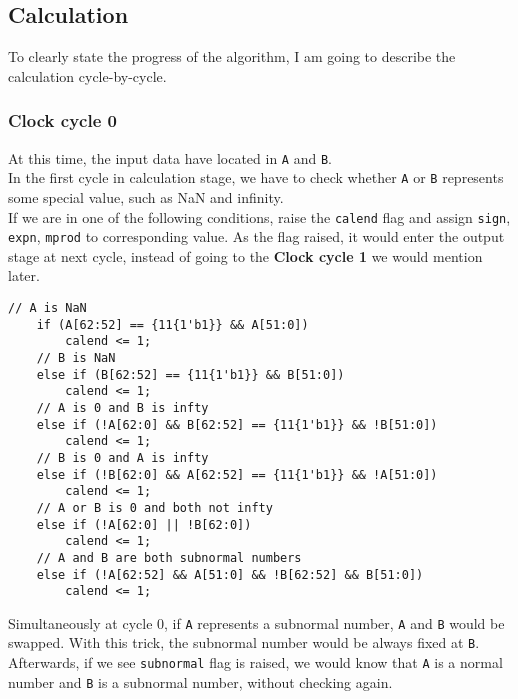 \documentclass{article}
\begin{document}
        \subsection{Calculation}
            To clearly state the progress of the algorithm, I am going to describe the calculation cycle-by-cycle.
            \subsubsection*{Clock cycle 0}
                At this time, the input data have located in {\tt A} and {\tt B}. \\
                In the first cycle in calculation stage, we have to check whether {\tt A} or {\tt B} represents some special value, such as NaN and infinity. \\
                If we are in one of the following conditions, raise the {\tt calend} flag and assign {\tt sign}, {\tt expn}, {\tt mprod} to corresponding value. As the flag raised, it would enter the output stage at next cycle, instead of going to the {\bf Clock cycle 1} we would mention later.
                \begin{lstlisting}[style=verilog-style]
    // A is NaN
    if (A[62:52] == {11{1'b1}} && A[51:0])
        calend <= 1;
    // B is NaN
    else if (B[62:52] == {11{1'b1}} && B[51:0])
        calend <= 1;
    // A is 0 and B is infty
    else if (!A[62:0] && B[62:52] == {11{1'b1}} && !B[51:0])
        calend <= 1;
    // B is 0 and A is infty
    else if (!B[62:0] && A[62:52] == {11{1'b1}} && !A[51:0])
        calend <= 1;
    // A or B is 0 and both not infty
    else if (!A[62:0] || !B[62:0])
        calend <= 1;
    // A and B are both subnormal numbers
    else if (!A[62:52] && A[51:0] && !B[62:52] && B[51:0])
        calend <= 1;
                \end{lstlisting}
                
                Simultaneously at cycle 0, if {\tt A} represents a subnormal number, {\tt A} and {\tt B} would be swapped. 
                With this trick, the subnormal number would be always fixed at {\tt B}.
                Afterwards, if we see {\tt subnormal} flag is raised, we would know that {\tt A} is a normal number and {\tt B} is a subnormal number, without checking again.
\end{document}
